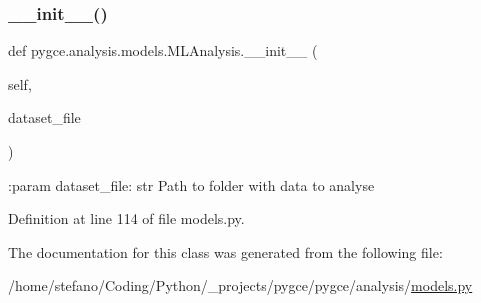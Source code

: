 \subsubsection{\texorpdfstring{\+\_\+\+\_\+init\+\_\+\+\_\+()}{\_\_init\_\_()}}
{\footnotesize\ttfamily def pygce.\+analysis.\+models.\+M\+L\+Analysis.\+\_\+\+\_\+init\+\_\+\+\_\+ (\begin{DoxyParamCaption}\item[{}]{self,  }\item[{}]{dataset\+\_\+file }\end{DoxyParamCaption})}

\begin{DoxyVerb}:param dataset_file: str
    Path to folder with data to analyse
\end{DoxyVerb}
 

Definition at line 114 of file models.\+py.



The documentation for this class was generated from the following file\+:\begin{DoxyCompactItemize}
\item 
/home/stefano/\+Coding/\+Python/\+\_\+projects/pygce/pygce/analysis/\hyperlink{models_8py}{models.\+py}\end{DoxyCompactItemize}
